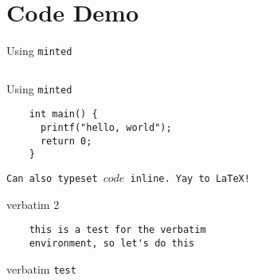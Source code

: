 \section{Code Demo}
\begin{frame}[fragile]{Using \texttt{minted}}
    \inputminted{c}{code/example.c}
\end{frame}

\begin{frame}[fragile]{Using \texttt{minted}}
    \begin{verbatim}
    int main() {
      printf("hello, world");
      return 0;
    }
    \end{verbatim}
    \texttt{Can also typeset $code$ inline. Yay to \LaTeX{}!}
\end{frame}

\begin{frame}[c,fragile]{verbatim 2}
    \begin{verbatim}
    this is a test for the verbatim
    environment, so let's do this
    \end{verbatim}
\end{frame}


\begin{frame}[c,fragile]{verbatim}
    \verb!test!
\end{frame}

